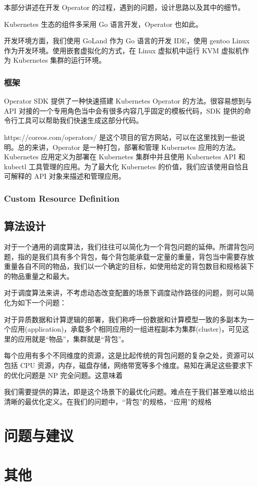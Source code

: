 本部分讲述在开发 Operator 的过程，遇到的问题，设计思路以及其中的细节。

Kubernetes 生态的组件多采用 Go 语言开发，Operator 也如此。

开发环境方面，我们使用 GoLand 作为 Go 语言的开发 IDE，使用 gentoo Linux 作为开发环境。使用嵌套虚拟化的方式，在 Linux 虚拟机中运行 KVM 虚拟机作为 Kubernetes 集群的运行环境。

\subsubsection{框架}

Operator SDK 提供了一种快速搭建 Kubernetes Operator 的方法。很容易想到与 API 对接的一个专用角色当中会有很多内容几乎固定的模板代码，SDK 提供的命令行工具可以帮助我们快速生成这部分代码。

https://coreos.com/operators/ 是这个项目的官方网站，可以在这里找到一些说明。总的来讲，Operator 是一种打包，部署和管理 Kubernetes 应用的方法。Kubernetes 应用定义为部署在 Kubernetes 集群中并且使用 Kubernetes API 和 kubectl 工具管理的应用。为了最大化 Kubernetes 的价值，我们应该使用自恰且可解释的 API 对象来描述和管理应用。

\subsubsection{Custom Resource Definition}

\subsection{算法设计}

对于一个通用的调度算法，我们往往可以简化为一个背包问题的延伸。所谓背包问题，指的是我们具有多个背包，每个背包能承载一定量的重量，背包当中需要存放重量各自不同的物品，我们以一个确定的目标，如使用给定的背包数目和规格装下的物品重量之和最大。

对于调度算法来讲，不考虑动态改变配置的场景下调度动作路径的问题，则可以简化为如下一个问题：

对于异质数据和计算逻辑的部署，我们称呼一份数据和计算模型一致的多副本为一个应用(application)，承载多个相同应用的一组进程副本为集群(cluster)，可见这里的应用就是“物品”，集群就是“背包”。

每个应用有多个不同维度的资源，这是比起传统的背包问题的复杂之处，资源可以包括 CPU 资源，内存，磁盘存储，网络带宽等多个维度。易知在满足这些要求下的优化问题是 NP 完全问题。这意味着

我们需要提供的算法，即是这个场景下的最优化问题。难点在于我们甚至难以给出清晰的最优化定义。在我们的问题中，“背包”的规格，“应用”的规格

\section{问题与建议}

\section{其他}
